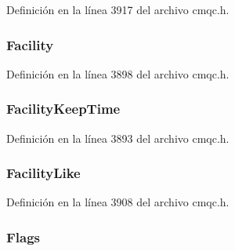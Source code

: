 Definición en la línea 3917 del archivo cmqc.\+h.

\hypertarget{structtag_m_q_c_i_h_aafac78a4e33645493558724cf66dfec3}{}
\subsubsection[{Facility}]{ Facility}\label{structtag_m_q_c_i_h_aafac78a4e33645493558724cf66dfec3}


Definición en la línea 3898 del archivo cmqc.\+h.

\hypertarget{structtag_m_q_c_i_h_ac8e9281c6d15b02751ada00a03bfd0ed}{}
\subsubsection[{Facility\+Keep\+Time}]{ Facility\+Keep\+Time}\label{structtag_m_q_c_i_h_ac8e9281c6d15b02751ada00a03bfd0ed}


Definición en la línea 3893 del archivo cmqc.\+h.

\hypertarget{structtag_m_q_c_i_h_aebf0e763ed1e8b3d7e99e02db303534a}{}
\subsubsection[{Facility\+Like}]{ Facility\+Like}\label{structtag_m_q_c_i_h_aebf0e763ed1e8b3d7e99e02db303534a}


Definición en la línea 3908 del archivo cmqc.\+h.

\hypertarget{structtag_m_q_c_i_h_a8da770267273b200fa9c968fa2a0da57}{}
\subsubsection[{Flags}]{ Flags}\label{structtag_m_q_c_i_h_a8da770267273b200fa9c968fa2a0da57}


